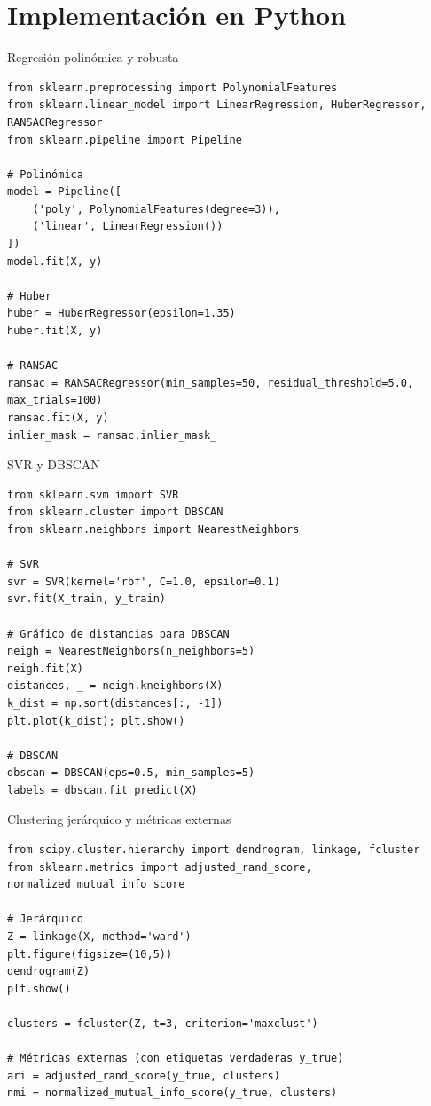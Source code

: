 \documentclass[aspectratio=169, 10pt, xcolor=table]{beamer}
\begin{document}
\section{Implementación en Python}

\begin{frame}[fragile]{Regresión polinómica y robusta}
    \begin{lstlisting}
from sklearn.preprocessing import PolynomialFeatures
from sklearn.linear_model import LinearRegression, HuberRegressor, RANSACRegressor
from sklearn.pipeline import Pipeline

# Polinómica
model = Pipeline([
    ('poly', PolynomialFeatures(degree=3)),
    ('linear', LinearRegression())
])
model.fit(X, y)

# Huber
huber = HuberRegressor(epsilon=1.35)
huber.fit(X, y)

# RANSAC
ransac = RANSACRegressor(min_samples=50, residual_threshold=5.0, max_trials=100)
ransac.fit(X, y)
inlier_mask = ransac.inlier_mask_
    \end{lstlisting}
\end{frame}

\begin{frame}[fragile]{SVR y DBSCAN}
    \begin{lstlisting}
from sklearn.svm import SVR
from sklearn.cluster import DBSCAN
from sklearn.neighbors import NearestNeighbors

# SVR
svr = SVR(kernel='rbf', C=1.0, epsilon=0.1)
svr.fit(X_train, y_train)

# Gráfico de distancias para DBSCAN
neigh = NearestNeighbors(n_neighbors=5)
neigh.fit(X)
distances, _ = neigh.kneighbors(X)
k_dist = np.sort(distances[:, -1])
plt.plot(k_dist); plt.show()

# DBSCAN
dbscan = DBSCAN(eps=0.5, min_samples=5)
labels = dbscan.fit_predict(X)
    \end{lstlisting}
\end{frame}

\begin{frame}[fragile]{Clustering jerárquico y métricas externas}
    \begin{lstlisting}
from scipy.cluster.hierarchy import dendrogram, linkage, fcluster
from sklearn.metrics import adjusted_rand_score, normalized_mutual_info_score

# Jerárquico
Z = linkage(X, method='ward')
plt.figure(figsize=(10,5))
dendrogram(Z)
plt.show()

clusters = fcluster(Z, t=3, criterion='maxclust')

# Métricas externas (con etiquetas verdaderas y_true)
ari = adjusted_rand_score(y_true, clusters)
nmi = normalized_mutual_info_score(y_true, clusters)
    \end{lstlisting}
\end{frame}
\end{document}
